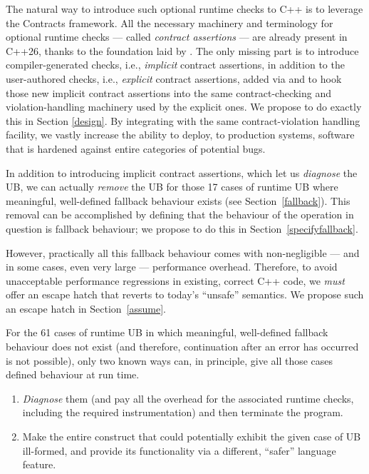 The natural way to introduce such optional runtime checks to C++ is to leverage the Contracts framework. All the necessary machinery and terminology for optional runtime checks --- called \emph{contract assertions} --- are already present in C++26, thanks to the foundation laid by \cite{P2900R14}. The only missing part is to introduce compiler-generated checks, i.e., \emph{implicit} contract assertions, in addition to the user-authored checks, i.e., \emph{explicit} contract assertions,  added via \cite{P2900R14} and to hook those new implicit contract assertions into the same contract-checking and violation-handling machinery used by the explicit ones. We propose to do exactly this in Section \ref{design}. By integrating with the same contract-violation handling facility, we vastly increase the ability to deploy, to production systems, software that is hardened against entire categories of potential bugs.

In addition to introducing implicit contract assertions, which let us \emph{diagnose} the UB, we can actually \emph{remove} the UB for those 17 cases of runtime UB where meaningful, well-defined fallback behaviour exists (see Section~\ref{fallback}). This removal can be accomplished by defining that the behaviour of the operation in question is fallback behaviour; we propose to do this in Section~\ref{specifyfallback}.

However, practically all this fallback behaviour comes with non-negligible --- and in some cases, even very large --- performance overhead. Therefore, to avoid unacceptable performance regressions in existing, correct C++ code, we \emph{must} offer an escape hatch that reverts to today's ``unsafe'' semantics. We propose such an escape hatch in Section~\ref{assume}.

For the 61 cases of runtime UB in which meaningful, well-defined fallback behaviour does not exist (and therefore, continuation after an error has occurred is not possible), only two known ways can, in principle, give all those cases defined behaviour at run time.
\begin{enumerate}
\renewcommand{\labelenumi}{\arabic{enumi}.}
\item \emph{Diagnose} them (and pay all the overhead for the associated runtime checks, including the required instrumentation) and then terminate the program.
\item Make the entire construct that could potentially exhibit the given case of UB ill-formed, and provide its functionality via a different, ``safer'' language feature.
\end{enumerate}


